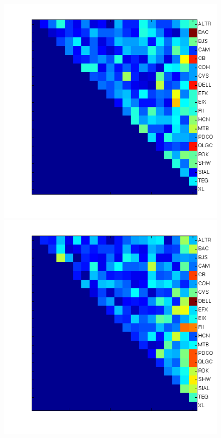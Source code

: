 \documentclass{article}
\begin{document}
\begin{figure}[h!tbp]
  \centering               
  \includegraphics[height=0.18\textheight]{fig/stocks1.png}
  \includegraphics[height=0.18\textheight]{fig/stocks2.png}

\end{figure}
\end{document}

